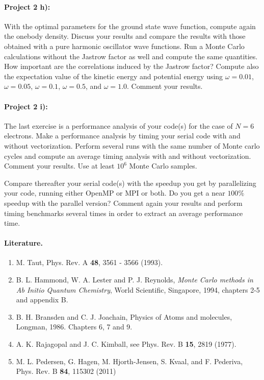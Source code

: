 \documentclass[%
oneside,                 %
final,                   %
10pt]{article}
\begin{document}
\paragraph{Project 2 h):}
With the optimal parameters for the ground state wave function, compute again the onebody density. Discuss your results and compare the results with those obtained with a pure harmonic oscillator
wave functions. Run a Monte Carlo calculations without the Jastrow factor as well
and compute the same quantities. How important are the correlations induced by the Jastrow factor?
Compute also the expectation value of the kinetic energy and potential energy using $\omega=0.01$,
$\omega=0.05$, $\omega=0.1$, $\omega=0.5$, and $\omega=1.0$. Comment your results.

\paragraph{Project 2 i):}
The last exercise  is a performance analysis of your code(s) for the case of $N=6$ electrons. Make a performance analysis by timing your serial code
with and without vectorization. Perform several runs with the same number of Monte carlo cycles and compute an average timing analysis
with and without vectorization. Comment your results. Use at least $10^6$ Monte Carlo samples. 

Compare thereafter your serial code(s)  with the speedup you get by parallelizing your code, running either OpenMP or MPI or both.
Do you get a near $100\%$ speedup with the parallel version? Comment again your results and perform timing benchmarks several times in order 
to extract  an average performance time. 

\paragraph{Literature.}
\begin{enumerate}
\item M. Taut, Phys. Rev. A \textbf{48}, 3561 - 3566 (1993).

\item B. L. Hammond, W. A. Lester and P. J. Reynolds, \emph{Monte Carlo methods in Ab Initio Quantum Chemistry}, World Scientific, Singapore, 1994, chapters 2-5 and appendix B.

\item B. H. Bransden and C. J. Joachain, Physics of Atoms and molecules, Longman, 1986. Chapters 6, 7 and 9.

\item A. K.  Rajagopal and J. C. Kimball, see Phys. Rev. B \textbf{15}, 2819 (1977).

\item M. L. Pedersen, G. Hagen, M. Hjorth-Jensen, S. Kvaal,  and F. Pederiva, Phys. Rev. B \textbf{84}, 115302 (2011)
\end{enumerate}
\end{document}
